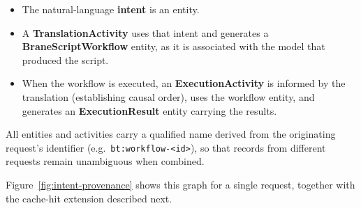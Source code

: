 \begin{itemize}
    \item The natural-language \textbf{intent} is an entity.
    \item A \textbf{TranslationActivity} uses that intent and generates a
        \textbf{BraneScriptWorkflow} entity, as it is associated with the model
        that produced the script.
    \item When the workflow is executed, an \textbf{ExecutionActivity} is
        informed by the translation (establishing causal order), uses the
        workflow entity, and generates an \textbf{ExecutionResult} entity
        carrying the results.
\end{itemize}

All entities and activities carry a qualified name derived from the
originating request's identifier (e.g.\ \texttt{bt:workflow-<id>}), so that
records from different requests remain unambiguous when combined.

Figure~\ref{fig:intent-provenance} shows this graph for a single request,
together with the cache-hit extension described next.

